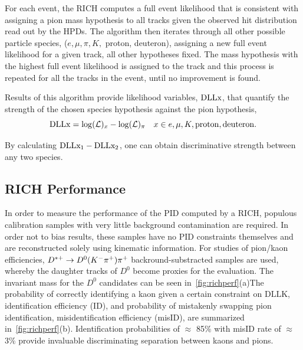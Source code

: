For each event, the \Gls{RICH} computes a full event likelihood that is consistent with assigning a pion mass hypothesis to all tracks given the observed hit distribution read out by the \Gls{HPD}s. The algorithm then iterates through all other possible particle species, ($e, \mu, \pi, K,$ proton, deuteron), assigning a new full event likelihood for a given track, \DIFdelbegin {}\DIFdelend \DIFaddbegin {}\DIFaddend all other hypotheses fixed. The mass hypothesis with the highest full event likelihood is assigned to the track and this process is repeated for all the tracks in the event, until no improvement is found. 

Results of this algorithm provide likelihood variables, $\rm{\textrm{DLL{x}}}$, that quantify the strength of the chosen species hypothesis against the pion hypothesis,
\begin{equation}
	\textrm{\textrm{DLL{x}}} = \mathrm{log}(\mathcal{L})_{x} - \mathrm{log}(\mathcal{L})_{\pi} \quad  x\in{e, \mu, K, \rm{proton, deuteron}}.
\end{equation}

By calculating $\rm{DLL{x_{1}} - DLL{x_{2}}}$, one can obtain discriminative strength between any two species.

\subsection{RICH Performance}
\label{RICHperf}
In order to measure the performance of the \Gls{PID} computed by a \gls{RICH}, populous calibration samples with very little background contamination are required. In order not to bias results, these samples have no \Gls{PID} constraints themselves and are reconstructed solely using kinematic information. For studies of pion/kaon efficiencies, $D^{*+} \rightarrow D^{0}({K}^{-}{{\pi}^+}){{\pi}^+}$ backround-substracted samples are used, whereby the daughter tracks of \DIFaddbegin {}\DIFaddend $D^{0}$ become proxies for the evaluation. The invariant mass for the $D^{0}$ candidates can be seen in~\autoref{fig:richperf}(a)\DIFaddbegin {}\DIFaddend The probability of correctly identifying a kaon given a certain constraint on $\textrm{DLL{K}}$, \DIFaddbegin {}\DIFaddend identification efficiency (\Gls{ID}), and \DIFaddbegin {}\DIFaddend probability of mistakenly swapping pion identification, \DIFaddbegin {}\DIFaddend misidentification efficiency (\gls{misID}), are summarized in~\autoref{fig:richperf}(b). Identification probabilities of $\approx$ 85\% with \DIFaddbegin {}\DIFaddend misID rate of $\approx$ 3\% provide invaluable discriminating separation between kaons and pions.





